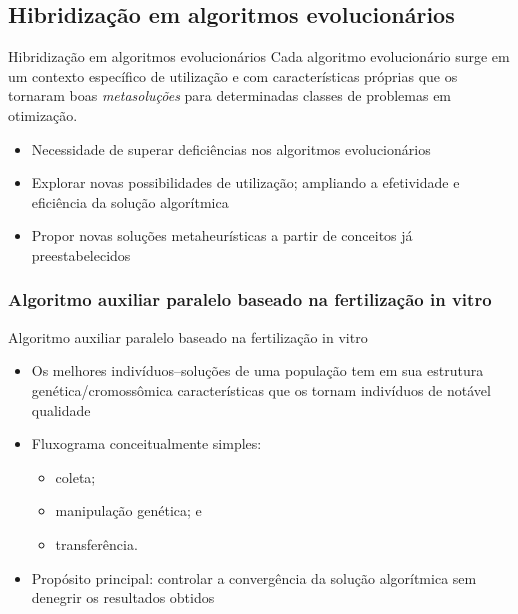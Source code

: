 \documentclass{beamer}
\begin{document}
\subsection{Hibridização em algoritmos evolucionários}
\begin{frame}{Hibridização em algoritmos evolucionários}
Cada algoritmo evolucion\'{a}rio surge em um contexto espec\'{i}fico de utiliza\c{c}\~{a}o e com caracter\'{i}sticas pr\'{o}prias que os
tornaram boas \textit{metasolu\c{c}\~{o}es} para determinadas classes de problemas em otimiza\c{c}\~{a}o.
\begin{itemize}
\item<1-> Necessidade de superar deficiências nos algoritmos evolucionários
\item<2-> Explorar novas possibilidades de utilização; ampliando a efetividade e eficiência da solução algorítmica
\item<3-> Propor novas soluções metaheurísticas a partir de conceitos já preestabelecidos
\end{itemize}
\end{frame}

\subsubsection{Algoritmo auxiliar paralelo baseado na fertiliza\c{c}\~{a}o in vitro}
\begin{frame}{Algoritmo auxiliar paralelo baseado na fertiliza\c{c}\~{a}o in vitro}
\begin{itemize}
\item<1-> Os melhores indiv\'{i}duos--solu\c{c}\~{o}es de uma popula\c{c}\~{a}o tem em sua estrutura gen\'{e}tica/cromoss\^{o}mica
caracter\'{i}sticas que os tornam indiv\'{i}duos de not\'{a}vel qualidade
\item<2-> Fluxograma conceitualmente simples:
\begin{itemize}
\item<3-> coleta;
\item<4-> manipula\c{c}\~{a}o gen\'{e}tica; e
\item<5-> transfer\^{e}ncia.
\end{itemize}
\item<6-> Propósito principal: controlar a convergência da solução algorítmica sem denegrir os resultados obtidos
\end{itemize}
\end{frame}
\end{document}
